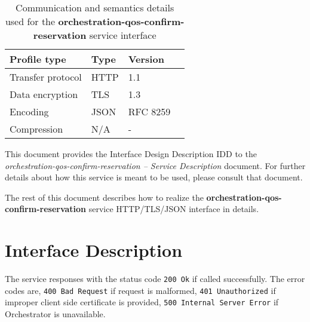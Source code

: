 \documentclass[a4paper]{arrowhead}
\begin{document}
\begin{table}[ht!]
  \centering
  \begin{tabular}{|l|l|l|l|}
    \rowcolor{gray!33} Profile type & Type & Version \\ \hline
    Transfer protocol & HTTP & 1.1 \\ \hline
    Data encryption & TLS & 1.3 \\ \hline
    Encoding & JSON & RFC 8259 \cite{rfc8259} \\ \hline
    Compression & N/A & - \\ \hline
  \end{tabular}
  \caption{Communication and semantics details used for the \textbf{orchestration-qos-confirm-reservation} service interface}
  \label{tab:comunication_semantics_profile}
\end{table}

This document provides the Interface Design Description IDD to the \textit{orchestration-qos-confirm-reservation -- Service Description} document.
For further details about how this service is meant to be used, please consult that document.

The rest of this document describes how to realize the \textbf{orchestration-qos-confirm-reservation} service HTTP/TLS/JSON interface in details.

\newpage

\section{Interface Description}
\label{sec:functions}

The service responses with the status code \texttt{200 Ok} if called successfully. The error codes are, \texttt{400 Bad Request} if request is malformed, \texttt{401 Unauthorized} if improper client side certificate is provided, \texttt{500 Internal Server Error} if Orchestrator is unavailable.
\end{document}
